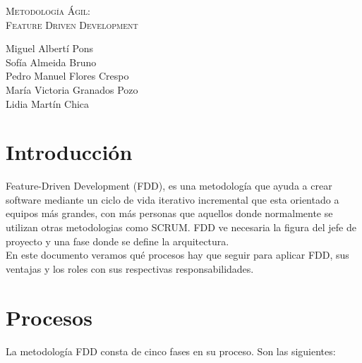 \documentclass[11pt]{article}
\begin{document}
\begin{titlepage}
\centering
\vspace{4.5cm}
{\scshape\LARGE Metodología Ágil:\\ Feature Driven Development\par}
\vspace{1.5cm}


\vspace{3cm}
{\scshape\large \par}
\vspace{1cm}

{Miguel Albertí Pons\\
Sofía Almeida Bruno\\
Pedro Manuel Flores Crespo\\
María Victoria Granados Pozo\\
Lidia Martín Chica
\par}

\end{titlepage}

\thispagestyle{empty}
\tableofcontents

\newpage

\section{Introducción}

Feature-Driven Development (FDD), es una metodología que ayuda a crear software mediante un ciclo de vida iterativo incremental que esta orientado a equipos más grandes, con más personas que aquellos donde normalmente se utilizan otras metodologias como SCRUM. FDD ve necesaria la figura del jefe de proyecto y una fase donde se define la arquitectura. \\

En este documento veramos qué procesos hay que seguir para aplicar FDD, sus ventajas y los roles con sus respectivas responsabilidades.




\section{Procesos}

La metodología FDD consta de cinco fases en su proceso. Son las siguientes:
\end{document}
